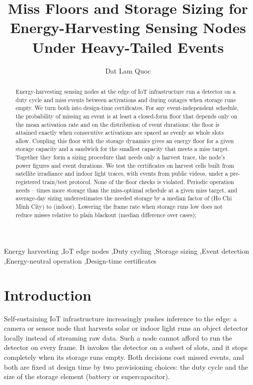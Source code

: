 \documentclass[final,5p,times,twocolumn]{elsarticle}
\theoremstyle{definition}
\theoremstyle{remark}
\begin{document}
\begin{frontmatter}
\title{Miss Floors and Storage Sizing for Energy-Harvesting Sensing Nodes Under Heavy-Tailed Events}
\author[fsb]{Dat Lam Quoc}

\begin{abstract}
Energy-harvesting sensing nodes at the edge of IoT infrastructure run a detector on a duty cycle and miss events between activations and during outages when storage runs empty. We turn both into design-time certificates. For any event-independent schedule, the probability of missing an event is at least a closed-form floor that depends only on the mean activation rate and on the distribution of event durations; the floor is attained exactly when consecutive activations are spaced as evenly as whole slots allow. Coupling this floor with the storage dynamics gives an energy floor for a given storage capacity and a sandwich for the smallest capacity that meets a miss target. Together they form a sizing procedure that needs only a harvest trace, the node's power figures and event durations. We test the certificates on \nTraceCells{} harvest cells built from satellite irradiance and indoor light traces, with \nEv{} events from \nVid{} public videos, under a pre-registered train/test protocol. None of the \nFloorChecks{} floor checks is violated. Periodic operation needs \tsInvLo--\tsInvHi{} times more storage than the miss-optimal schedule at a given miss target, and average-day sizing underestimates the needed storage by a median factor of \avgHCMC{} (Ho Chi Minh City) to \avgIn{} (indoor). Lowering the frame rate when storage runs low does not reduce misses relative to plain blackout (median difference \thrMedSigned{} over \nThr{} cases); \EabstractSentence{}
\end{abstract}

\begin{keyword}
Energy harvesting \sep IoT edge nodes \sep Duty cycling \sep Storage sizing \sep Event detection \sep Energy-neutral operation \sep Design-time certificates
\end{keyword}
\end{frontmatter}

\section{Introduction}\label{sec:intro}
Self-sustaining IoT infrastructure increasingly pushes inference to the edge: a camera or sensor node that harvests solar or indoor light runs an object detector locally instead of streaming raw data. Such a node cannot afford to run the detector on every frame. It invokes the detector on a subset of slots, and it stops completely when its storage runs empty. Both decisions cost missed events, and both are fixed at design time by two provisioning choices: the duty cycle and the size of the storage element (battery or supercapacitor).
\end{document}
